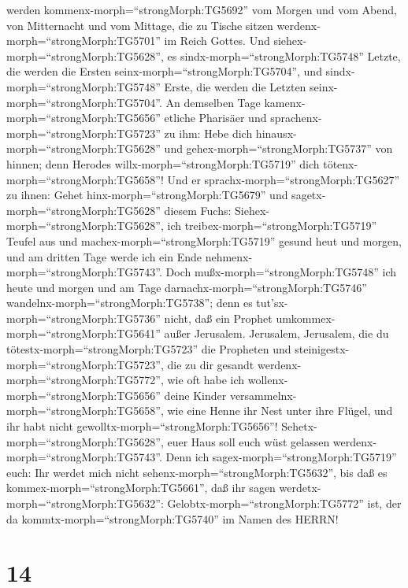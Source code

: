 werden kommenx-morph=``strongMorph:TG5692'' vom Morgen und vom Abend,
von Mitternacht und vom Mittage, die zu Tische sitzen
werdenx-morph=``strongMorph:TG5701'' im Reich Gottes.  Und
siehex-morph=``strongMorph:TG5628'', es
sindx-morph=``strongMorph:TG5748'' Letzte, die werden die Ersten
seinx-morph=``strongMorph:TG5704'', und
sindx-morph=``strongMorph:TG5748'' Erste, die werden die Letzten
seinx-morph=``strongMorph:TG5704''.  An demselben Tage
kamenx-morph=``strongMorph:TG5656'' etliche Pharisäer und
sprachenx-morph=``strongMorph:TG5723'' zu ihm: Hebe dich
hinausx-morph=``strongMorph:TG5628'' und
gehex-morph=``strongMorph:TG5737'' von hinnen; denn Herodes
willx-morph=``strongMorph:TG5719'' dich
tötenx-morph=``strongMorph:TG5658''!  Und er
sprachx-morph=``strongMorph:TG5627'' zu ihnen: Gehet
hinx-morph=``strongMorph:TG5679'' und
sagetx-morph=``strongMorph:TG5628'' diesem Fuchs:
Siehex-morph=``strongMorph:TG5628'', ich
treibex-morph=``strongMorph:TG5719'' Teufel aus und
machex-morph=``strongMorph:TG5719'' gesund heut und morgen, und am
dritten Tage werde ich ein Ende nehmenx-morph=``strongMorph:TG5743''.
 Doch mußx-morph=``strongMorph:TG5748'' ich heute und
morgen und am Tage darnachx-morph=``strongMorph:TG5746''
wandelnx-morph=``strongMorph:TG5738''; denn es
tut'sx-morph=``strongMorph:TG5736'' nicht, daß ein Prophet
umkommex-morph=``strongMorph:TG5641'' außer Jerusalem. 
Jerusalem, Jerusalem, die du tötestx-morph=``strongMorph:TG5723'' die
Propheten und steinigestx-morph=``strongMorph:TG5723'', die zu dir
gesandt werdenx-morph=``strongMorph:TG5772'', wie oft habe ich
wollenx-morph=``strongMorph:TG5656'' deine Kinder
versammelnx-morph=``strongMorph:TG5658'', wie eine Henne ihr Nest unter
ihre Flügel, und ihr habt nicht gewolltx-morph=``strongMorph:TG5656''!
 Sehetx-morph=``strongMorph:TG5628'', euer Haus soll euch
wüst gelassen werdenx-morph=``strongMorph:TG5743''. Denn ich
sagex-morph=``strongMorph:TG5719'' euch: Ihr werdet mich nicht
sehenx-morph=``strongMorph:TG5632'', bis daß es
kommex-morph=``strongMorph:TG5661'', daß ihr sagen
werdetx-morph=``strongMorph:TG5632'':
Gelobtx-morph=``strongMorph:TG5772'' ist, der da
kommtx-morph=``strongMorph:TG5740'' im Namen des HERRN!

\hypertarget{section-13}{%
\section{14}\label{section-13}}

